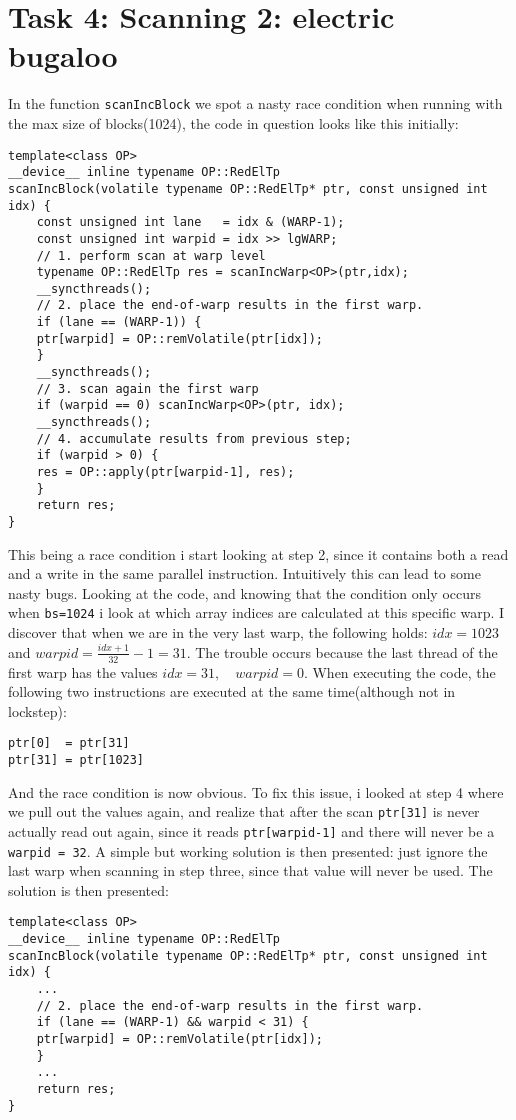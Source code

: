 \documentclass[11pt]{article}
\begin{document}
\section{Task 4: Scanning 2: electric bugaloo}
\label{sec:org6ae1ea0}
In the function \texttt{scanIncBlock} we spot a nasty race condition when running
with the max size of blocks(1024), the code in question looks like this initially:
\begin{verbatim}
template<class OP>
__device__ inline typename OP::RedElTp
scanIncBlock(volatile typename OP::RedElTp* ptr, const unsigned int idx) {
    const unsigned int lane   = idx & (WARP-1);
    const unsigned int warpid = idx >> lgWARP;
    // 1. perform scan at warp level
    typename OP::RedElTp res = scanIncWarp<OP>(ptr,idx);
    __syncthreads();
    // 2. place the end-of-warp results in the first warp.
    if (lane == (WARP-1)) { 
	ptr[warpid] = OP::remVolatile(ptr[idx]);
    }
    __syncthreads();
    // 3. scan again the first warp
    if (warpid == 0) scanIncWarp<OP>(ptr, idx);
    __syncthreads();
    // 4. accumulate results from previous step;
    if (warpid > 0) {
	res = OP::apply(ptr[warpid-1], res);
    }
    return res;
}
\end{verbatim}
This being a race condition i start looking at step 2, since it contains
both a read and a write in the same parallel instruction. Intuitively
this can lead to some nasty bugs.  
Looking at the code, and knowing that the condition only occurs when \texttt{bs=1024}
i look at which array indices are calculated at this specific warp.
I discover that when we are in the very last warp, the following holds:
\(idx = 1023\) and \(warpid = \frac{idx+1}{32}-1 = 31\). The trouble occurs
because the last thread of the first warp has the values \(idx = 31, \quad warpid=0\).  
When executing the code, the following two instructions are executed at the 
same time(although not in lockstep):
\begin{verbatim}
ptr[0]  = ptr[31]
ptr[31] = ptr[1023]
\end{verbatim}
And the race condition is now obvious.  
To fix this issue, i looked at step 4 where we pull out the values again,
and realize that after the scan \texttt{ptr[31]} is never actually read out again,
since it reads \texttt{ptr[warpid-1]} and there will never be a \texttt{warpid = 32}.
A simple but working solution is then presented: just ignore the last warp
when scanning in step three, since that value will never be used. The
solution is then presented:
\begin{verbatim}
template<class OP>
__device__ inline typename OP::RedElTp
scanIncBlock(volatile typename OP::RedElTp* ptr, const unsigned int idx) {
    ...
    // 2. place the end-of-warp results in the first warp.
    if (lane == (WARP-1) && warpid < 31) { 
	ptr[warpid] = OP::remVolatile(ptr[idx]);
    }
    ...
    return res;
}
\end{verbatim}
\end{document}
